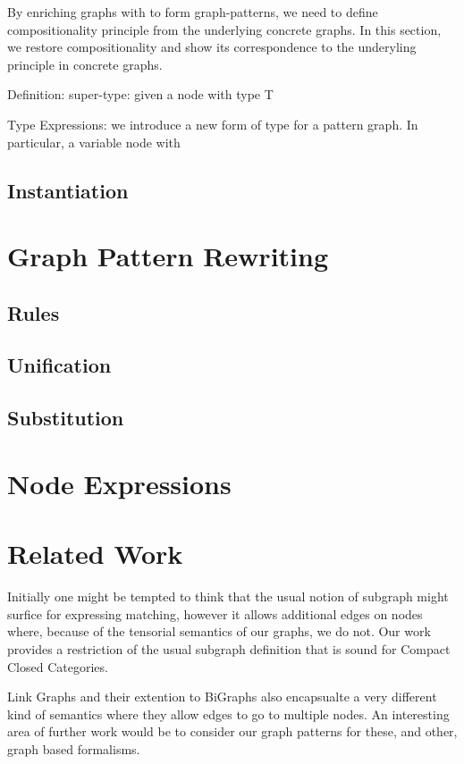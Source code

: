 \documentclass[runningheads]{llncs}
\begin{document}
By enriching graphs with to form
graph-patterns, we need to define compositionality principle from the
underlying concrete graphs. In this section, we restore
compositionality and show its correspondence to the underyling
principle in concrete graphs.

Definition: super-type: given a node with type T

Type Expressions: we introduce a new form of type for a pattern
graph. In particular, a variable node with 


\subsection{Instantiation}



\section{Graph Pattern Rewriting}
\label{sec:rewriting}

\subsection{Rules}
\subsection{Unification}
\subsection{Substitution}


\section{Node Expressions}
\label{sec:node-expressions}


\section{Related Work}
\label{sec:relatedwork}

Initially one might be tempted to think that the usual notion of
subgraph might surfice for expressing matching, however it allows
additional edges on nodes where, because of the tensorial semantics of
our graphs, we do not. Our work provides a restriction of the usual
subgraph definition that is sound for Compact Closed Categories.

Link Graphs and their extention to BiGraphs also encapsualte a very
different kind of semantics where they allow edges to go to multiple
nodes. An interesting area of further work would be to consider our
graph patterns for these, and other, graph based formalisms.
\end{document}
